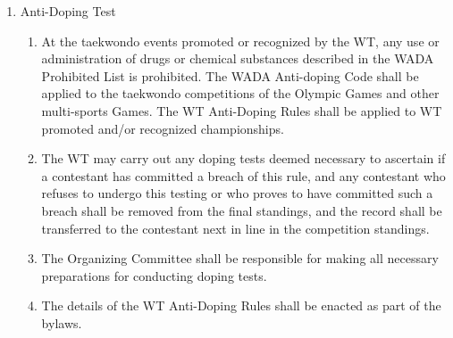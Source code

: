 \documentclass[
]{report}
\providecommand{\tightlist}{%
  \setlength{\itemsep}{0pt}\setlength{\parskip}{0pt}}
\begin{document}
\begin{enumerate}
\begin{enumerate}
\begin{enumerate}
      \begin{itemize}
      \tightlist
      \item
        Trunk PSS and Head PSS-related items and equipment
      \item
        Mats
      \item
        Stationary Bicycle
      \item
        Running Machine
      \item
        Emergency equipment (refer to medical code for detailed
        information)
      \item
        Ice in the baskets
      \item
        Refrigerators
      \item
        Bottled water
      \end{itemize}
    \item
      It is the responsibility of the Organizing Committee to obtain
      approval of the WT on the number of the equipment to be prepared.
    \end{enumerate}
  \end{enumerate}
\item
  Anti-Doping Test

  \begin{enumerate}
  \item
    At the taekwondo events promoted or recognized by the WT, any use or
    administration of drugs or chemical substances described in the WADA
    Prohibited List is prohibited. The WADA Anti-doping Code shall be
    applied to the taekwondo competitions of the Olympic Games and other
    multi-sports Games. The WT Anti-Doping Rules shall be applied to WT
    promoted and/or recognized championships.
  \item
    The WT may carry out any doping tests deemed necessary to ascertain
    if a contestant has committed a breach of this rule, and any
    contestant who refuses to undergo this testing or who proves to have
    committed such a breach shall be removed from the final standings,
    and the record shall be transferred to the contestant next in line
    in the competition standings.
  \item
    The Organizing Committee shall be responsible for making all
    necessary preparations for conducting doping tests.
  \item
    The details of the WT Anti-Doping Rules shall be enacted as part of
    the bylaws.
  \end{enumerate}
\end{enumerate}
\end{document}
